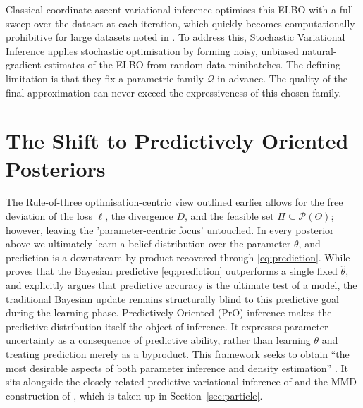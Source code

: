 \documentclass[mstat,12pt]{unswthesis}
\begin{document}
Classical coordinate-ascent variational inference optimises this ELBO with a full sweep over the dataset at each iteration, which quickly becomes computationally prohibitive for large datasets noted in \cite{blei2017variational,  hoffman2013stochastic}. To address this, Stochastic Variational Inference \cite{hoffman2013stochastic} applies stochastic optimisation by forming noisy, unbiased natural-gradient estimates of the ELBO from random data minibatches.
The defining limitation is that they fix a parametric family $\mathcal{Q}$ in advance. The quality of the final approximation can never exceed the expressiveness of this chosen family.

\section{The Shift to Predictively Oriented Posteriors}
\label{sec:pro}

The Rule-of-three optimisation-centric view outlined earlier allows for the free deviation of the loss $\ell$, the divergence $D$, and the feasible set $\Pi \subseteq \mathcal{P}(\Theta)$; however, leaving the 'parameter-centric focus' untouched. In every posterior above we ultimately learn a belief distribution over the parameter $\theta$, and prediction is a downstream by-product recovered through \eqref{eq:prediction}. While \cite{aitchison1975goodness} proves that the Bayesian predictive \eqref{eq:prediction} outperforms a single fixed $\hat\theta$, and explicitly argues that predictive accuracy is the ultimate test of a model, the traditional Bayesian update remains structurally blind to this predictive goal during the learning phase.
Predictively Oriented (PrO) inference \citep{mclatchie2025pro} makes the predictive distribution itself the object of inference. It expresses parameter uncertainty as a consequence of predictive ability, rather than learning $\theta$ and treating prediction merely as a byproduct. This framework seeks to obtain ``the most desirable aspects of both parameter inference and density estimation'' \citep{mclatchie2025pro}. It sits alongside the closely related predictive variational inference of \citet{lai2024pvi} and the MMD construction of \citet{shen2025pcuq}, which is taken up in Section~\ref{sec:particle}.
\end{document}
